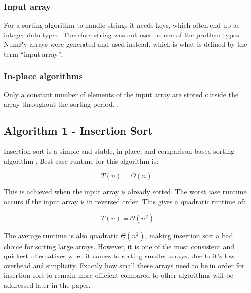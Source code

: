 \documentclass[sigconf, nonacm, natbib, screen, balance=False]{acmart}
\begin{document}
\subsubsection{Input array}\label{sec:input}
For a sorting algorithm to handle strings it needs keys, which often end up as integer data types. Therefore string was not used as one of the problem types. NumPy arrays were generated and used instead, which is what is defined by the term ``input array''.

\subsubsection{In-place algorithms}\label{sec:in-place}
Only a constant number of elements of the input array are stored outside the array throughout the sorting period. \citet[II.Sorting and Order Statistics, p.148]{CLRS_2009}.

\subsection{Algorithm 1 - Insertion Sort}\label{sec:algo1}
Insertion sort %
is a simple and stable, in place, and comparison based sorting algorithm \citet[Ch.~2.1]{CLRS_2009}. Best case runtime for this algorithm is:

\begin{equation}
  T(n) = \Omega(n) \;.  \label{eq:ins_sort_best}
\end{equation}

This is achieved when the input array is already sorted. The worst case runtime occurs if the input array is in reversed order. This gives a quadratic runtime of:

\begin{equation}
  T(n) = \mathcal{O}(n^2) \;  \label{eq:ins_sort_worst}
\end{equation}

The average runtime is also quadratic $\Theta(n^2)$, making insertion sort a bad choice for sorting large arrays. However, it is one of the most consistent and quickest alternatives when it comes to sorting smaller arrays, due to it's low overhead and simplicity. Exactly how small these arrays need to be in order for insertion sort to remain more efficient compared to other algorithms will be addressed later in the paper. 

%
\end{document}
